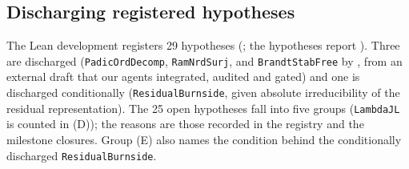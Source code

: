 \subsection{Discharging registered hypotheses}\label{ss:stage2-hyp}
The Lean development registers 29 hypotheses (; the hypotheses report
). Three are discharged (\texttt{PadicOrdDecomp}, \texttt{RamNrdSurj}, and \texttt{BrandtStabFree} by ,
from an external draft that our agents integrated, audited and gated) and one is
discharged conditionally (\texttt{ResidualBurnside}, given absolute irreducibility of the residual representation). The
25 open hypotheses fall into five groups (\texttt{LambdaJL} is counted in (D)); the reasons are those recorded in the registry and the milestone closures. Group (E) also names the condition behind the conditionally discharged \texttt{ResidualBurnside}.
